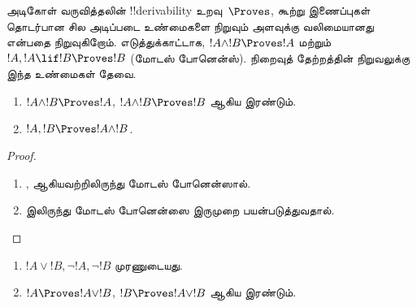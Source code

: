 \documentclass[../../../include/open-logic-section]{subfiles}
\begin{document}
      {}
      {}


\begin{explain}
  அடிகோள் வருவித்தலின் !!{derivability} உறவு~$\Proves$, கூற்று இணைப்புகள்
  தொடர்பான சில அடிப்படை உண்மைகளை நிறுவும் அளவுக்கு வலிமையானது என்பதை
  நிறுவுகிறோம். எடுத்துக்காட்டாக, $!A \land !B \Proves !A$ மற்றும் $!A,
  !A \lif !B \Proves !B$ (மோடஸ் போனென்ஸ்). நிறைவுத் தேற்றத்தின்
  நிறுவலுக்கு இந்த உண்மைகள் தேவை.
\end{explain}

\begin{prop}
  \begin{enumerate}
  \item {} $!A \land !B \Proves
    !A$, $!A \land !B \Proves !B$ ஆகிய இரண்டும்.
  \item {} $!A, !B \Proves !A \land !B$.
  \end{enumerate}
\end{prop}

\begin{proof}
  \begin{enumerate}
    \item {},  ஆகியவற்றிலிருந்து
      மோடஸ் போனென்ஸால்.
  \item {} இலிருந்து மோடஸ் போனென்ஸை இருமுறை
    பயன்படுத்துவதால்.
  \end{enumerate}
\end{proof}


\begin{prop}
  \begin{enumerate}
  \item $!A \lor !B, \lnot !A, \lnot !B$ முரணுடையது.
  \item $!A \Proves !A \lor !B$, $!B \Proves !A \lor !B$ ஆகிய இரண்டும்.
  \end{enumerate}
\end{prop}
\end{document}
